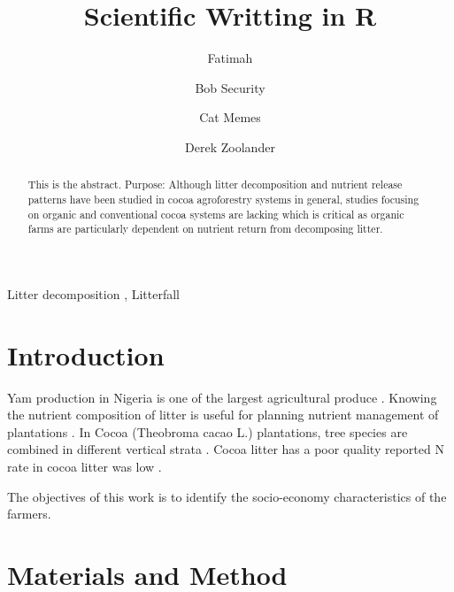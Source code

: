 \documentclass[preprint, 3p,
authoryear]{elsarticle} %
\begin{document}
\begin{frontmatter}

  \title{Scientific Writting in R}
    \author[IITA]{Fatimah%
  }
    \author[Another University]{Bob Security}
    \author[Another University]{Cat Memes%
  }
    \author[Some Institute of Technology]{Derek Zoolander%
  }
  
  \begin{abstract}
  This is the abstract. Purpose: Although litter decomposition and
  nutrient release patterns have been studied in cocoa agroforestry
  systems in general, studies focusing on organic and conventional cocoa
  systems are lacking which is critical as organic farms are
  particularly dependent on nutrient return from decomposing litter.
  \end{abstract}
    \begin{keyword}
    Litter decomposition \sep 
    Litterfall
  \end{keyword}
  
 \end{frontmatter}

\hypertarget{introduction}{%
\section{Introduction}\label{introduction}}

Yam production in Nigeria is one of the largest agricultural produce
\citep{pérez-flores2017a}. Knowing the nutrient composition of litter is
useful for planning nutrient management of plantations
\citep{bai2022leaf}. In Cocoa (Theobroma cacao L.) plantations, tree
species are combined in different vertical strata
\citep{fontes2014nutrient, pérez-flores2017a, Dirac1953888, Feynman1963118}.
Cocoa litter has a poor quality \citet{fontes2014nutrient} reported N
rate in cocoa litter was low .

The objectives of this work is to identify the socio-economy
characteristics of the farmers.

\hypertarget{materials-and-method}{%
\section{Materials and Method}\label{materials-and-method}}
\end{document}
